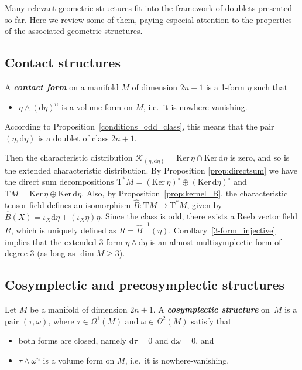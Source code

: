 \documentclass[11pt,twoside]{article}
\theoremstyle{plain}
\theoremstyle{definition}
\renewcommand{\d}{\mathrm{d}}
\newcommand{\T}{{\mathrm T}}
\let\Tan\T
\newcommand*{\inn}[1]{\iota_{#1}}
\def\d{\mathrm{d}}
\newcommand\dfn[1]{{\textbf{\emph{#1}}}}
\def\d{\mathrm{d}}
\def\Ker{\mathrm{Ker \,}}
\def\Tan{\mathrm{T}}
\def\K{\mathcal{K}}
\begin{document}
Many relevant geometric structures fit into the framework of doublets
presented so far.
Here we review some of them,
paying especial attention to the properties of the associated geometric structures.

\subsection{Contact structures}
A \dfn{contact form} on a manifold $M$ of dimension $2n+1$ is a 1-form $\eta$ such that
\begin{itemize}
\item 
$\eta \wedge (\d\eta)^n$ is a volume form on $M$, i.e.\ it is nowhere-vanishing.
\end{itemize}    
According to Proposition~\ref{conditions_odd_class}, 
this means that
the pair $(\eta, \d\eta)$ is a doublet of class $2n+1$. 

Then the characteristic distribution
$\K_{(\eta,\d\eta)}= \Ker \eta \cap \Ker \d\eta$ is zero, 
and so is the extended characteristic distribution.
By Proposition \ref{prop:directsum}
we have the direct sum decompositions
$
\Tan^* M = (\Ker \eta)^{\circ} \oplus (\Ker \d\eta)^{\circ} 
$
and
$
\Tan M = \Ker \eta \oplus \Ker \d \eta 
$.
Also, by Proposition~\ref{prop:kernel_B}, 
the characteristic tensor field defines an isomorphism
$\widehat B \colon \Tan M \to \Tan^*M$,
given by 
$\widehat B(X) = \inn{X} \d\eta + (\inn{X} \eta )\eta$.  
Since the class is odd, there exists a Reeb vector field $R$, which is uniquely defined as $R = \widehat B^{-1}(\eta)$. 
Corollary~\ref{3-form_injective} implies that 
the extended 3-form $\eta \wedge \d \eta$ 
is an almost-multisymplectic form of degree 3 (as long as $\dim M \geq 3$).

\subsection{Cosymplectic and precosymplectic structures}

    Let $M$ be a manifold of dimension $2n+1$.
    A \dfn{cosymplectic structure} on~$M$ is a pair 
    $(\tau, \omega)$, where $\tau \in \Omega^1(M)$ and $\omega \in \Omega^2(M)$ satisfy that
    \begin{itemize}
        \item both forms are closed, namely $\d \tau = 0$ and $\d\omega = 0$, and
        \item $\tau \wedge \omega^n$ is a volume form on $M$, i.e.\ it is nowhere-vanishing.
    \end{itemize}
\end{document}
